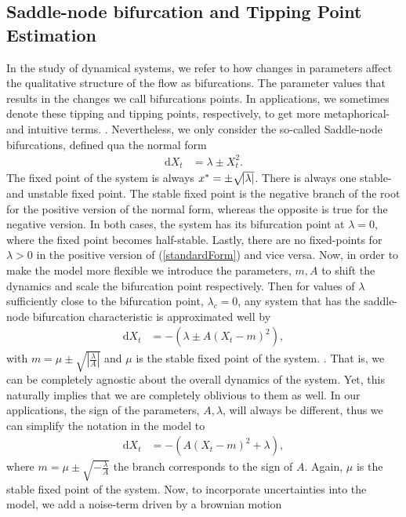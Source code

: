 \subsection{Saddle-node bifurcation and Tipping Point Estimation}
In the study of dynamical systems, we refer to how changes in parameters affect the qualitative structure of the flow as bifurcations. The parameter values that results in the changes we call bifurcations points. In applications, we sometimes denote these tipping and tipping points, respectively, to get more metaphorical- and intuitive terms. \cite{Strogatz2019_gv}. Nevertheless, we only consider the so-called Saddle-node bifurcations, defined qua the normal form
\begin{align}
    \mathrm{d}X_t &= \lambda \pm X_t^2. \label{standardForm}
\end{align}
The fixed point of the system is always $x^* = \pm\sqrt{\abs{\lambda}}$. There is always one stable- and unstable fixed point. The stable fixed point is the negative branch of the root for the positive version of the normal form, whereas the opposite is true for the negative version. In both cases, the system has its bifurcation point at $\lambda = 0$, where the fixed point becomes half-stable. Lastly, there are no fixed-points for $\lambda>0$ in the positive version of (\ref{standardForm}) and vice versa. Now, in order to make the model more flexible we introduce the parameters, $m, A$ to shift the dynamics and scale the bifurcation point respectively. Then for values of $\lambda$ sufficiently close to the bifurcation point, $\lambda_c = 0$, any system that has the saddle-node bifurcation characteristic is approximated well by 
\begin{align}
    \mathrm{d}X_t &= -\left(\lambda \pm A\left(X_t - m\right)^2\right), 
\end{align}
with $m = \mu \pm \sqrt{\left|\frac{\lambda}{A}\right|}$ and $\mu$ is the stable fixed point of the system. \cite{Ditlevsen2023}. That is, we can be completely agnostic about the overall dynamics of the system. Yet, this naturally implies that we are completely oblivious to them as well. In our applications, the sign of the parameters, $A, \lambda$, will always be different, thus we can simplify the notation in the model to
\begin{align}
    \mathrm{d}X_t &= -\left(A\left(X_t - m\right)^2 + \lambda\right), 
\end{align}
where $m = \mu \pm \sqrt{-\frac{\lambda}{A}}$ the branch corresponds to the sign of $A$. Again, $\mu$ is the stable fixed point of the system. Now, to incorporate uncertainties into the model, we add a noise-term driven by a brownian motion
